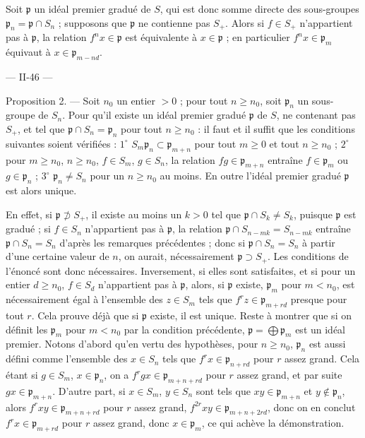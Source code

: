 Soit $\mathfrak{p}$ un idéal premier gradué de $S$, qui est donc somme directe des sous-groupes $\mathfrak{p}_n = \mathfrak{p} \cap S_n$ ; supposons que $\mathfrak{p}$ ne contienne pas $S_+$. Alors si $f \in S_+$ n'appartient pas à $\mathfrak{p}$, la relation $f^n x \in \mathfrak{p}$ est équivalente à $x \in \mathfrak{p}$ ; en particulier $f^n x \in \mathfrak{p}_m$ équivaut à $x \in \mathfrak{p}_{m-nd}$.

\newpage


— II-46 —

Proposition 2. — Soit $n_0$ un entier $> 0$ ; pour tout $n \ge n_0$, soit $\mathfrak{p}_n$ un sous-groupe de $S_n$. Pour qu'il existe un idéal premier gradué $\mathfrak{p}$ de $S$, ne contenant pas $S_+$, et tel que $\mathfrak{p} \cap S_n = \mathfrak{p}_n$ pour tout $n \ge n_0$ : il faut et il suffit que les conditions suivantes soient vérifiées : $1^\circ$ $S_m \mathfrak{p}_n \subset \mathfrak{p}_{m+n}$ pour tout $m \ge 0$ et tout $n \ge n_0$ ; $2^\circ$ pour $m \ge n_0$, $n \ge n_0$, $f \in S_m$, $g \in S_n$, la relation $fg \in \mathfrak{p}_{m+n}$ entraîne $f \in \mathfrak{p}_m$ ou $g \in \mathfrak{p}_n$ ; $3^\circ$ $\mathfrak{p}_n \neq S_n$ pour un $n \ge n_0$ au moins. En outre l'idéal premier gradué $\mathfrak{p}$ est alors unique.

En effet, si $\mathfrak{p} \not\supset S_+$, il existe au moins un $k > 0$ tel que $\mathfrak{p} \cap S_k \neq S_k$, puisque $\mathfrak{p}$ est gradué ; si $f \in S_n$ n'appartient pas à $\mathfrak{p}$, la relation $\mathfrak{p} \cap S_{n-mk} = S_{n-mk}$ entraîne $\mathfrak{p} \cap S_n = S_n$ d'après les remarques précédentes ; donc si $\mathfrak{p} \cap S_n = S_n$ à partir d'une certaine valeur de $n$, on aurait, nécessairement $\mathfrak{p} \supset S_+$. Les conditions de l'énoncé sont donc nécessaires. Inversement, si elles sont satisfaites, et si pour un entier $d \ge n_0$, $f \in S_d$ n'appartient pas à $\mathfrak{p}$, alors, si $\mathfrak{p}$ existe, $\mathfrak{p}_m$ pour $m < n_0$, est nécessairement égal à l'ensemble des $z \in S_m$ tels que $f^r z \in \mathfrak{p}_{m+rd}$ presque pour tout $r$. Cela prouve déjà que si $\mathfrak{p}$ existe, il est unique. Reste à montrer que si on définit les $\mathfrak{p}_m$ pour $m < n_0$ par la condition précédente, $\mathfrak{p} = \bigoplus \mathfrak{p}_m$ est un idéal premier. Notons d'abord qu'en vertu des hypothèses, pour $n \ge n_0$, $\mathfrak{p}_n$ est aussi défini comme l'ensemble des $x \in S_n$ tels que $f^r x \in \mathfrak{p}_{n+rd}$ pour $r$ assez grand. Cela étant si $g \in S_m$, $x \in \mathfrak{p}_n$, on a $f^r gx \in \mathfrak{p}_{m+n+rd}$ pour $r$ assez grand, et par suite $gx \in \mathfrak{p}_{m+n}$. D'autre part, si $x \in S_m$, $y \in S_n$ sont tels que $xy \in \mathfrak{p}_{m+n}$ et $y \notin \mathfrak{p}_n$, alors $f^r xy \in \mathfrak{p}_{m+n+rd}$ pour $r$ assez grand, $f^{2r} xy \in \mathfrak{p}_{m+n+2rd}$, donc on en conclut $f^r x \in \mathfrak{p}_{m+rd}$ pour $r$ assez grand, donc $x \in \mathfrak{p}_m$, ce qui achève la démonstration.

